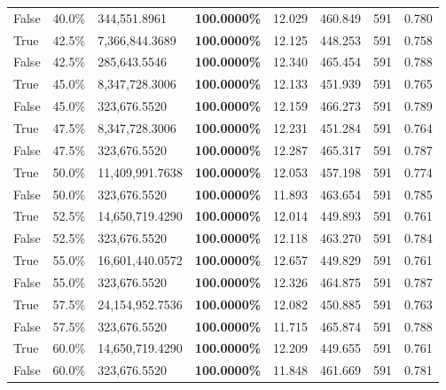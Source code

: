 \begin{table}[H]
\begin{tabular}{lllrllll}
\cline{1-8}
False & 40.0\% & 344,551.8961 & \bfseries \color{red} 100.0000\% & 12.029 & 460.849 & 591 & 0.780 \\
\cline{1-8}
True & 42.5\% & 7,366,844.3689 & \bfseries \color{red} 100.0000\% & 12.125 & 448.253 & 591 & 0.758 \\
\cline{1-8}
False & 42.5\% & \color{red} 285,643.5546 & \bfseries \color{red} 100.0000\% & 12.340 & 465.454 & 591 & 0.788 \\
\cline{1-8}
True & 45.0\% & 8,347,728.3006 & \bfseries \color{red} 100.0000\% & 12.133 & 451.939 & 591 & 0.765 \\
\cline{1-8}
False & 45.0\% & 323,676.5520 & \bfseries \color{red} 100.0000\% & 12.159 & 466.273 & 591 & 0.789 \\
\cline{1-8}
True & 47.5\% & 8,347,728.3006 & \bfseries \color{red} 100.0000\% & 12.231 & 451.284 & 591 & 0.764 \\
\cline{1-8}
False & 47.5\% & 323,676.5520 & \bfseries \color{red} 100.0000\% & 12.287 & 465.317 & 591 & 0.787 \\
\cline{1-8}
True & 50.0\% & 11,409,991.7638 & \bfseries \color{red} 100.0000\% & 12.053 & 457.198 & 591 & 0.774 \\
\cline{1-8}
False & 50.0\% & 323,676.5520 & \bfseries \color{red} 100.0000\% & 11.893 & 463.654 & 591 & 0.785 \\
\cline{1-8}
True & 52.5\% & 14,650,719.4290 & \bfseries \color{red} 100.0000\% & 12.014 & 449.893 & 591 & 0.761 \\
\cline{1-8}
False & 52.5\% & 323,676.5520 & \bfseries \color{red} 100.0000\% & 12.118 & 463.270 & 591 & 0.784 \\
\cline{1-8}
True & 55.0\% & 16,601,440.0572 & \bfseries \color{red} 100.0000\% & 12.657 & 449.829 & 591 & 0.761 \\
\cline{1-8}
False & 55.0\% & 323,676.5520 & \bfseries \color{red} 100.0000\% & 12.326 & 464.875 & 591 & 0.787 \\
\cline{1-8}
True & 57.5\% & 24,154,952.7536 & \bfseries \color{red} 100.0000\% & 12.082 & 450.885 & 591 & 0.763 \\
\cline{1-8}
False & 57.5\% & 323,676.5520 & \bfseries \color{red} 100.0000\% & 11.715 & 465.874 & 591 & 0.788 \\
\cline{1-8}
True & 60.0\% & 14,650,719.4290 & \bfseries \color{red} 100.0000\% & 12.209 & 449.655 & 591 & 0.761 \\
\cline{1-8}
False & 60.0\% & 323,676.5520 & \bfseries \color{red} 100.0000\% & 11.848 & 461.669 & 591 & 0.781 \\

\end{tabular}
\end{table}

